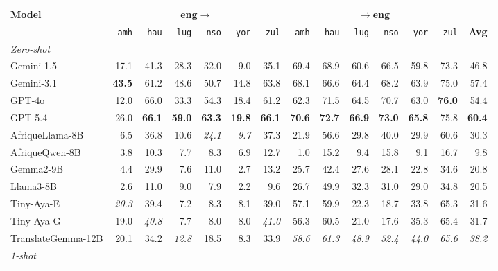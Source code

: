 \begin{table}[t]
\centering
\small
\renewcommand{\arraystretch}{1.05}
\begin{tabular}{lrrrrrrrrrrrrr}
\toprule
\textbf{Model} & \multicolumn{6}{c}{\textbf{eng$\to$}} & \multicolumn{6}{c}{\textbf{$\to$eng}} & \\
\cmidrule(lr){2-7}\cmidrule(lr){8-13}
   & \texttt{amh} & \texttt{hau} & \texttt{lug} & \texttt{nso} & \texttt{yor} & \texttt{zul} & \texttt{amh} & \texttt{hau} & \texttt{lug} & \texttt{nso} & \texttt{yor} & \texttt{zul} & \textbf{Avg} \\
\midrule
\multicolumn{14}{l}{\textit{Zero-shot}} \\
\midrule
Gemini-1.5 & 17.1 & 41.3 & 28.3 & 32.0 & 9.0 & 35.1 & 69.4 & 68.9 & 60.6 & 66.5 & 59.8 & 73.3 & 46.8 \\
Gemini-3.1 & \textbf{43.5} & 61.2 & 48.6 & 50.7 & 14.8 & 63.8 & 68.1 & 66.6 & 64.4 & 68.2 & 63.9 & 75.0 & 57.4 \\
GPT-4o & 12.0 & 66.0 & 33.3 & 54.3 & 18.4 & 61.2 & 62.3 & 71.5 & 64.5 & 70.7 & 63.0 & \textbf{76.0} & 54.4 \\
GPT-5.4 & 26.0 & \textbf{66.1} & \textbf{59.0} & \textbf{63.3} & \textbf{19.8} & \textbf{66.1} & \textbf{70.6} & \textbf{72.7} & \textbf{66.9} & \textbf{73.0} & \textbf{65.8} & 75.8 & \textbf{60.4} \\
\midrule
AfriqueLlama-8B & 6.5 & 36.8 & 10.6 & \emph{24.1} & \emph{9.7} & 37.3 & 21.9 & 56.6 & 29.8 & 40.0 & 29.9 & 60.6 & 30.3 \\
AfriqueQwen-8B & 3.8 & 10.3 & 7.7 & 8.3 & 6.9 & 12.7 & 1.0 & 15.2 & 9.4 & 15.8 & 9.1 & 16.7 & 9.8 \\
Gemma2-9B & 4.4 & 29.9 & 7.6 & 11.0 & 2.7 & 13.2 & 25.7 & 42.4 & 27.6 & 28.1 & 22.8 & 34.6 & 20.8 \\
Llama3-8B & 2.6 & 11.0 & 9.0 & 7.9 & 2.2 & 9.6 & 26.7 & 49.9 & 32.3 & 31.0 & 29.0 & 34.8 & 20.5 \\
Tiny-Aya-E & \emph{20.3} & 39.4 & 7.2 & 8.3 & 8.1 & 39.0 & 57.1 & 59.9 & 22.3 & 18.7 & 33.8 & 65.3 & 31.6 \\
Tiny-Aya-G & 19.0 & \emph{40.8} & 7.7 & 8.0 & 8.0 & \emph{41.0} & 56.3 & 60.5 & 21.0 & 17.6 & 35.3 & 65.4 & 31.7 \\
TranslateGemma-12B & 20.1 & 34.2 & \emph{12.8} & 18.5 & 8.3 & 33.9 & \emph{58.6} & \emph{61.3} & \emph{48.9} & \emph{52.4} & \emph{44.0} & \emph{65.6} & \emph{38.2} \\
\midrule\midrule
\multicolumn{14}{l}{\textit{1-shot}} \\

\end{tabular}
\end{table}

